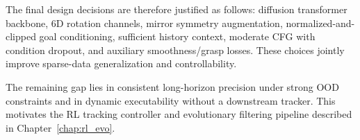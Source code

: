 The final design decisions are therefore justified as follows: diffusion transformer backbone, 6D rotation channels, mirror symmetry augmentation, normalized-and-clipped goal conditioning, sufficient history context, moderate CFG with condition dropout, and auxiliary smoothness/grasp losses. These choices jointly improve sparse-data generalization and controllability.

The remaining gap lies in consistent long-horizon precision under strong OOD constraints and in dynamic executability without a downstream tracker. This motivates the RL tracking controller and evolutionary filtering pipeline described in Chapter~\ref{chap:rl_evo}.
